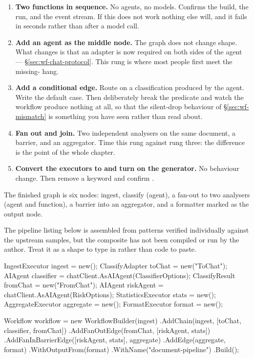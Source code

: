 \begin{enumerate}[leftmargin=1.4em]
\item \textbf{Two functions in sequence.} No agents, no models. Confirms the
      build, the run, and the event stream. If this does not work nothing else
      will, and it fails in seconds rather than after a model call.
\item \textbf{Add an agent as the middle node.} The graph does not change shape.
      What changes is that an adapter is now required on both sides of the agent
      --- \S\ref{sec:wf-chat-protocol}. This rung is where most people first meet
      the missing- hang.
\item \textbf{Add a conditional edge.} Route on a classification produced by the
      agent. Write the default case. Then deliberately break the predicate and
      watch the workflow produce nothing at all, so that the silent-drop
      behaviour of \S\ref{sec:wf-mismatch} is something you have seen rather than
      read about.
\item \textbf{Fan out and join.} Two independent analysers on the same document,
      a barrier, and an aggregator. Time this rung against rung three: the
      difference is the point of the whole chapter.
\item \textbf{Convert the executors to \code{[MessageHandler]} and turn on the
      generator.} No behaviour change. Then remove a  keyword and
      confirm .
\end{enumerate}

\noindent
The finished graph is six nodes: ingest, classify (agent), a fan-out to two
analysers (agent and function), a barrier into an aggregator, and a formatter
marked as the output node.

\begin{verifybox}
The pipeline listing below is assembled from patterns verified individually
against the upstream samples, but the composite has not been compiled or run by
the author. Treat it as a shape to type in rather than code to paste.
\end{verifybox}

\begin{csharp}[caption={The finished pipeline}, label={lst:wf-pipeline}]
IngestExecutor    ingest    = new();
ClassifyAdapter   toChat    = new("ToChat");
AIAgent           classifier = chatClient.AsAIAgent(ClassifierOptions);
ClassifyResult    fromChat  = new("FromChat");
AIAgent           riskAgent = chatClient.AsAIAgent(RiskOptions);
StatisticsExecutor stats    = new();
AggregateExecutor aggregate = new();
FormatExecutor    format    = new();

Workflow workflow = new WorkflowBuilder(ingest)
    .AddChain(ingest, [toChat, classifier, fromChat])
    .AddFanOutEdge(fromChat, [riskAgent, stats])
    .AddFanInBarrierEdge([riskAgent, stats], aggregate)
    .AddEdge(aggregate, format)
    .WithOutputFrom(format)
    .WithName("document-pipeline")
    .Build();
\end{csharp}

